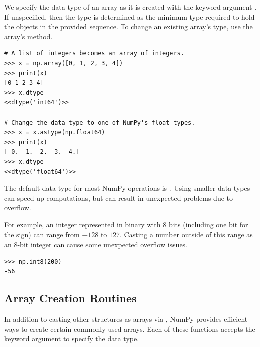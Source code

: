 We specify the data type of an array as it is created with the keyword argument .
If unspecified, then the type is determined as the minimum type required to hold the objects in the provided sequence.
To change an existing array's type, use the array's  method.

\begin{lstlisting}
# A list of integers becomes an array of integers.
>>> x = np.array([0, 1, 2, 3, 4])
>>> print(x)
[0 1 2 3 4]
>>> x.dtype
<<dtype('int64')>>

# Change the data type to one of NumPy's float types.
>>> x = x.astype(np.float64)
>>> print(x)
[ 0.  1.  2.  3.  4.]
>>> x.dtype
<<dtype('float64')>>
\end{lstlisting}

\begin{warn}
The default data type for most NumPy operations is .
Using smaller data types can speed up computations, but can result in unexpected problems due to overflow.

For example, an integer represented in binary with 8 bits (including one bit for the sign) can range from $-128$ to $127$.
Casting a number outside of this range as an 8-bit integer can cause some unexpected overflow issues.

\begin{lstlisting}
>>> np.int8(200)
-56
\end{lstlisting}
\end{warn}

\subsection*{Array Creation Routines} %

In addition to casting other structures as arrays via , NumPy provides efficient ways to create certain commonly-used arrays.
Each of these functions accepts the keyword argument  to specify the data type.

